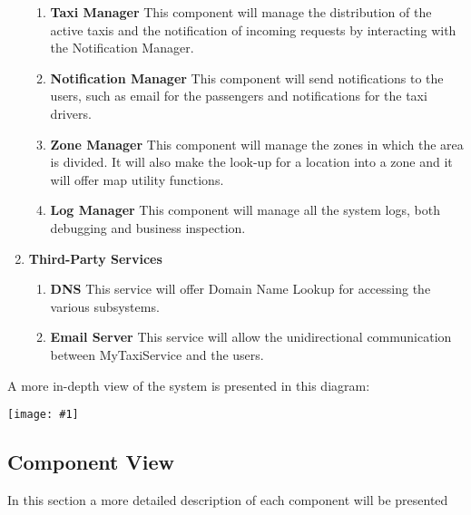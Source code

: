 \documentclass[11pt, a4paper,titlepage]{article}
\newcommand{\productname}{MyTaxiService }
\newcommand{\image}[1]{
	\begin{center}
		\noindent \texttt{[image: \#1]}
	\end{center}
	}
\begin{document}
\begin{enumerate}
\begin{enumerate}
		 		\item \label{itm:Component_TaxiManager} \textbf{Taxi Manager} This component will manage the distribution of the active taxis and the notification of incoming requests by interacting with the Notification Manager.
		 		\item \label{itm:Component_NotificationManager} \textbf{Notification Manager} This component will send notifications to the users, such as email for the passengers and notifications for the taxi drivers.
		 		\item \label{itm:Component_ZoneManager} \textbf{Zone Manager} This component will manage the zones in which the area is divided. It will also make the look-up for a location into a zone and it will offer map utility functions.
		 		\item \label{itm:Component_LogManager} \textbf{Log Manager} This component will manage all the system logs, both debugging and business inspection.
		 	\end{enumerate}
 	\item \textbf{Third-Party Services}
 	\begin{enumerate}
 		\item \label{itm:Component_DNS} \textbf{DNS} This service will offer Domain Name Lookup for accessing the various subsystems.
 		\item \label{itm:Component_EmailServer} \textbf{Email Server} This service will allow the unidirectional communication between \productname and the users.
 	\end{enumerate}
 \end{enumerate}
 \newpage
 A more in-depth view of the system is presented in this diagram: \newline
  \image{diagram_class_general.png}
\subsection{Component View}
In this section a more detailed description of each component will be presented
\end{document}
